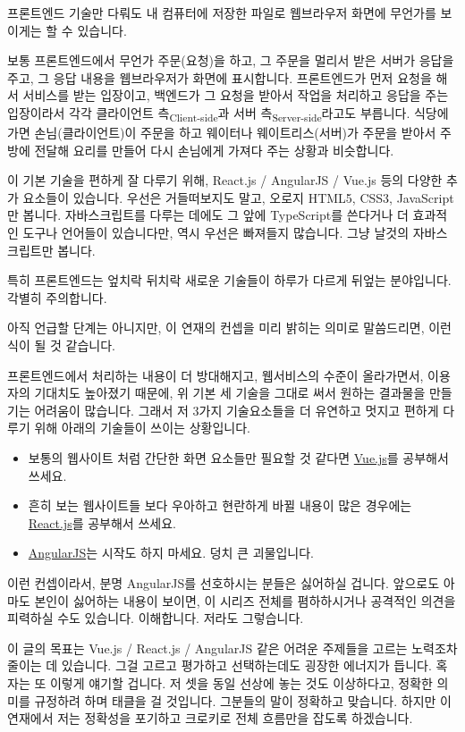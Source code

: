 \documentclass[11pt,a4paper]{article}
\newcommand{\sub}[1]{\textsubscript{#1}}
\begin{document}
프론트엔드 기술만 다뤄도 내 컴퓨터에 저장한 파일로 웹브라우저 화면에 무언가를 보이게는 할 수 있습니다.

보통 프론트엔드에서 무언가 주문(요청)을 하고, 그 주문을 멀리서 받은 서버가 응답을 주고, 그 응답 내용을 웹브라우저가 화면에 표시합니다. 프론트엔드가 먼저 요청을 해서 서비스를 받는 입장이고, 백엔드가 그 요청을 받아서 작업을 처리하고 응답을 주는 입장이라서 각각 클라이언트 측\sub{Client-side}과 서버 측\sub{Server-side}라고도 부릅니다. 식당에 가면 손님(클라이언트)이 주문을 하고 웨이터나 웨이트리스(서버)가 주문을 받아서 주방에 전달해 요리를 만들어 다시 손님에게 가져다 주는 상황과 비슷합니다.

이 기본 기술을 편하게 잘 다루기 위해, \textsf{React.js / AngularJS / Vue.js} 등의 다양한 추가 요소들이 있습니다. 우선은 거들떠보지도 말고, 오로지 \textsf{HTML5, CSS3,  JavaScript}만 봅니다. 자바스크립트를 다루는 데에도 그 앞에 \textsf{TypeScript}를 쓴다거나 더 효과적인 도구나 언어들이 있습니다만, 역시 우선은 빠져들지 많습니다. 그냥 날것의 자바스크립트만 봅니다.

특히 프론트엔드는 엎치락 뒤치락 새로운 기술들이 하루가 다르게 뒤엎는 분야입니다. 각별히 주의합니다.

아직 언급할 단계는 아니지만, 이 연재의 컨셉을 미리 밝히는 의미로 말씀드리면, 이런식이 될 것 같습니다.

프론트엔드에서 처리하는 내용이 더 방대해지고, 웹서비스의 수준이 올라가면서, 이용자의 기대치도 높아졌기 때문에, 위 기본 세 기술을 그대로 써서 원하는 결과물을 만들기는 어려움이 많습니다. 그래서 저 3가지 기술요소들을 더 유연하고 멋지고 편하게 다루기 위해 아래의 기술들이 쓰이는 상황입니다.

\begin{itemize}
\item 보통의 웹사이트 처럼 간단한 화면 요소들만 필요할 것 같다면 \href{https://vuejs.org}{Vue.js}를 공부해서 쓰세요.
\item 흔히 보는 웹사이트들 보다 우아하고 현란하게 바뀔 내용이 많은 경우에는 \href{https://facebook.github.io/react}{React.js}를 공부해서 쓰세요.
\item \href{https://angularjs.org}{AngularJS}는 시작도 하지 마세요. 덩치 큰 괴물입니다.
\end{itemize}

이런 컨셉이라서, 분명 \textsf{AngularJS}를 선호하시는 분들은 싫어하실 겁니다. 앞으로도 아마도 본인이 싫어하는 내용이 보이면, 이 시리즈 전체를 폄하하시거나 공격적인 의견을 피력하실 수도 있습니다. 이해합니다. 저라도 그렇습니다.

이 글의 목표는 \textsf{Vue.js / React.js / AngularJS} 같은 어려운 주제들을 고르는 노력조차 줄이는 데 있습니다. 그걸 고르고 평가하고 선택하는데도 굉장한 에너지가 듭니다. 혹자는 또 이렇게 얘기할 겁니다. 저 셋을 동일 선상에 놓는 것도 이상하다고, 정확한 의미를 규정하려 하며 태클을 걸 것입니다. 그분들의 말이 정확하고 맞습니다. 하지만 이 연재에서 저는 정확성을 포기하고 크로키로 전체 흐름만을 잡도록 하겠습니다.
\end{document}
